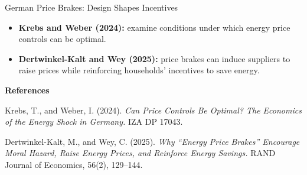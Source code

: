 \documentclass[11pt,aspectratio=169]{beamer}
\begin{document}
\begin{frame}{German Price Brakes: Design Shapes Incentives}
\begin{itemize}
\item \textbf{Krebs and Weber (2024):} examine conditions under which energy price controls can be optimal.
\item \textbf{Dertwinkel-Kalt and Wey (2025):} price brakes can induce suppliers to raise prices while reinforcing households' incentives to save energy.
\end{itemize}
\par\medskip\small
\textbf{References}\par
Krebs, T., and Weber, I. (2024). \emph{Can Price Controls Be Optimal? The Economics of the Energy Shock in Germany.} IZA DP 17043.
\par\medskip
Dertwinkel-Kalt, M., and Wey, C. (2025). \emph{Why ``Energy Price Brakes'' Encourage Moral Hazard, Raise Energy Prices, and Reinforce Energy Savings.} RAND Journal of Economics, 56(2), 129--144.
\end{frame}
\end{document}
